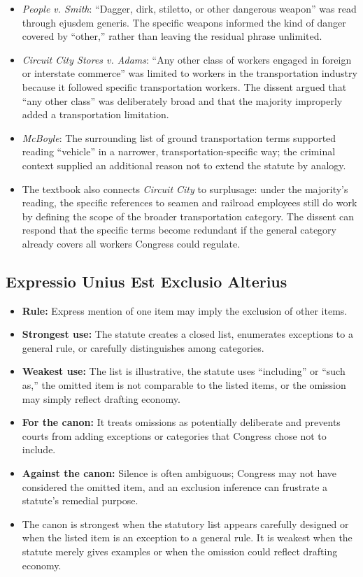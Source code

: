\documentclass[11pt]{tex/lawoutline}
\begin{document}
\begin{itemize}
    \item \textit{People v. Smith}: ``Dagger, dirk, stiletto, or other dangerous weapon'' was read through ejusdem generis. The specific weapons informed the kind of danger covered by ``other,'' rather than leaving the residual phrase unlimited.
    \item \textit{Circuit City Stores v. Adams}: ``Any other class of workers engaged in foreign or interstate commerce'' was limited to workers in the transportation industry because it followed specific transportation workers. The dissent argued that ``any other class'' was deliberately broad and that the majority improperly added a transportation limitation.
    \item \textit{McBoyle}: The surrounding list of ground transportation terms supported reading ``vehicle'' in a narrower, transportation-specific way; the criminal context supplied an additional reason not to extend the statute by analogy.
    \item The textbook also connects \textit{Circuit City} to surplusage: under the majority's reading, the specific references to seamen and railroad employees still do work by defining the scope of the broader transportation category. The dissent can respond that the specific terms become redundant if the general category already covers all workers Congress could regulate.
\end{itemize}

\subsection{Expressio Unius Est Exclusio Alterius}

\begin{itemize}
    \item \textbf{Rule:} Express mention of one item may imply the exclusion of other items.
    \item \textbf{Strongest use:} The statute creates a closed list, enumerates exceptions to a general rule, or carefully distinguishes among categories.
    \item \textbf{Weakest use:} The list is illustrative, the statute uses ``including'' or ``such as,'' the omitted item is not comparable to the listed items, or the omission may simply reflect drafting economy.
    \item \textbf{For the canon:} It treats omissions as potentially deliberate and prevents courts from adding exceptions or categories that Congress chose not to include.
    \item \textbf{Against the canon:} Silence is often ambiguous; Congress may not have considered the omitted item, and an exclusion inference can frustrate a statute's remedial purpose.
    \item The canon is strongest when the statutory list appears carefully designed or when the listed item is an exception to a general rule. It is weakest when the statute merely gives examples or when the omission could reflect drafting economy.
\end{itemize}
\end{document}

